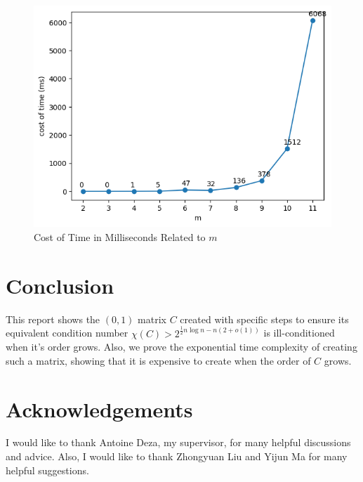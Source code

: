 \documentclass[11pt]{article}
\begin{document}
\begin{figure}[htp]
    \centering
    \includegraphics{fig/output.png}
    \caption{Cost of Time in Milliseconds Related to $m$}\label{costoftime}
\end{figure}

\section{Conclusion}
This report shows the $(0, 1)$ matrix $C$ created with specific steps to ensure its equivalent condition number $\chi(C) > 2^{\frac{1}{2}n\log n-n(2+o(1))}$ is ill-conditioned when it's order grows. Also, we prove the exponential time complexity of creating such a matrix, showing that it is expensive to create when the order of $C$ grows.

\section{Acknowledgements}
I would like to thank Antoine Deza, my supervisor, for many helpful discussions and advice. Also, I would like to thank Zhongyuan Liu and Yijun Ma for many helpful suggestions.

\newpage




\newpage
\appendix
\renewcommand{\thesection}{\Alph{section}.\arabic{section}}
\setcounter{section}{0}
\end{document}
